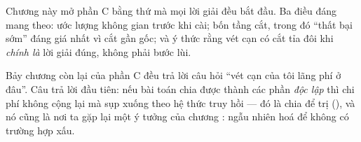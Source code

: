 \documentclass[../../algorithm.tex]{subfiles}
\begin{document}
Chương này mở phần C bằng thứ mà mọi lời giải đều bắt đầu. Ba điều đáng mang theo: ước lượng không gian trước khi cài; bốn tầng cắt, trong đó ``thất bại sớm'' đáng giá nhất vì cắt gần gốc; và ý thức rằng vét cạn có cắt tỉa đôi khi \emph{chính là} lời giải đúng, không phải bước lùi.

Bảy chương còn lại của phần C đều trả lời câu hỏi ``vét cạn của tôi lãng phí ở đâu''. Câu trả lời đầu tiên: nếu bài toán chia được thành các phần \emph{độc lập} thì chi phí không cộng lại mà sụp xuống theo hệ thức truy hồi --- đó là chia để trị (), và nó cũng là nơi ta gặp lại một ý tưởng của chương : ngẫu nhiên hoá để không có trường hợp xấu.
\ifSubfilesClassLoaded{\printbibliography[title={Nguồn}]}{}
\end{document}
